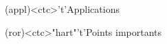 \documentclass[../../main/main.tex]{subfiles}
\begin{document}
\begin{tcn}[%
		sidebyside, fontupper=\small, fontlower=\small
	]
	\begin{tcn}[nsp](appl)<ctc>'t'{Applications}
	\end{tcn}
	\begin{tcn}[nsp](ror)<ctc>"hart"'t'{Points importants}
	\end{tcn}
\end{tcn}
\end{document}
